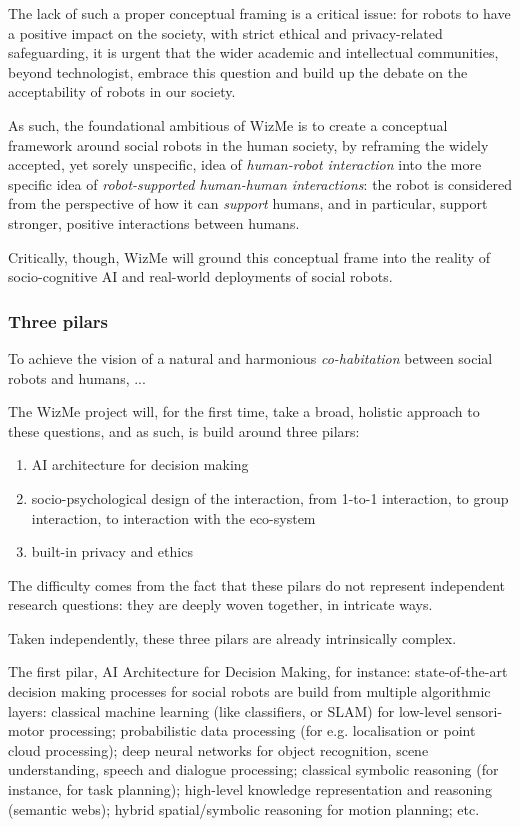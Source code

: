 \documentclass[]{article}
\newcommand{\project}{WizMe\xspace}
\begin{document}
The lack of such a proper conceptual framing is a critical issue: for robots to
have a positive impact on the society, with strict ethical and privacy-related
safeguarding, it is urgent that the wider academic and intellectual communities,
beyond technologist, embrace this question and build up the debate on the
acceptability of robots in our society.

As such, the foundational ambitious of \project is to create a conceptual
framework around social robots in the human society, by reframing the widely
accepted, yet sorely unspecific, idea of \emph{human-robot interaction} into the
more specific idea of \emph{robot-supported human-human interactions}: the robot
is considered from the perspective of how it can \emph{support} humans, and in
particular, support stronger, positive interactions between humans.

Critically, though, \project will ground this conceptual frame into the reality
of socio-cognitive AI and real-world deployments of social robots.


\subsubsection{Three pilars}

To achieve the vision of a natural and harmonious \emph{co-habitation} between
social robots and humans, ...

The \project project will, for the first time, take a broad, holistic approach
to these questions, and as such, is build around three pilars:

\begin{enumerate}
    \item AI architecture for decision making
    \item socio-psychological design of the interaction, from 1-to-1
        interaction, to group interaction, to interaction with the eco-system
    \item built-in privacy and ethics
\end{enumerate}

The difficulty comes from the fact that these pilars do not represent independent
research questions: they are deeply woven together, in intricate ways.


Taken independently, these three pilars are already intrinsically complex.

The first pilar, AI Architecture for Decision Making, for instance:
state-of-the-art decision making processes for social robots are build from
multiple algorithmic layers: classical machine learning (like classifiers, or
SLAM) for low-level sensori-motor processing; probabilistic data processing (for
e.g. localisation or point cloud processing); deep neural networks for object
recognition, scene understanding, speech and dialogue processing; classical
symbolic reasoning (for instance, for task planning); high-level knowledge
representation and reasoning (semantic webs); hybrid spatial/symbolic reasoning
for motion planning; etc.
\end{document}
